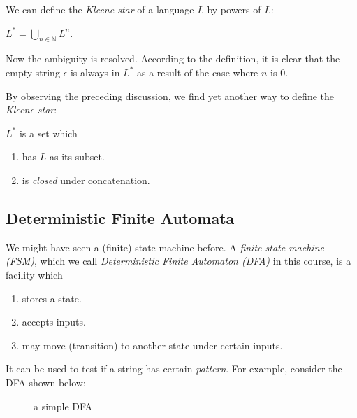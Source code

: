 \documentclass[11pt]{article}
\begin{document}
We can define the \emph{Kleene star} of a language $L$ by powers of $L$:
\begin{definition}
$L^\ast = \bigcup_{n \in \mathbb{N}}L^n$.
\end{definition}

Now the ambiguity is resolved. According to the definition, it is clear that the empty string $\epsilon$ is
always in $L^\ast$ as a result of the case where $n$ is $0$.

By observing the preceding discussion, we find yet another way to define the \emph{Kleene star}:
\begin{definition}
$L^\ast$ is a set which
\begin{enumerate}
\item has $L$ as its subset.
\item is \emph{closed} under concatenation.
\end{enumerate}
\end{definition}

\subsection{Deterministic Finite Automata}

We might have seen a (finite) state machine before. A \emph{finite state machine (FSM)}, which we call
\emph{Deterministic Finite Automaton (DFA)} in this course, is a facility which
\begin{enumerate}
\item stores a state.
\item accepts inputs.
\item may move (transition) to another state under certain inputs.
\end{enumerate}

It can be used to test if a string has certain \emph{pattern}. For example, consider the DFA shown below:
\begin{figure}[ht]
    \centering
    \caption{a simple DFA}
    \label{fig:fig1}
\end{figure}
\end{document}
